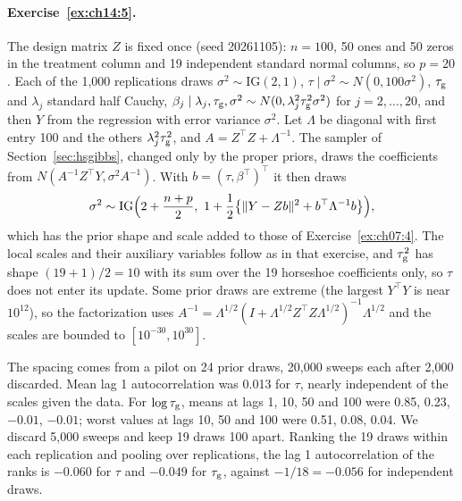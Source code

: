 \paragraph{Exercise~\ref{ex:ch14:5}.} The design matrix $Z$ is fixed once (seed 20261105): $n = 100$, 50 ones and 50 zeros in the treatment column and 19 independent standard normal columns, so $p = 20$. Each of the 1,000 replications draws $\sigma^2 \sim \mathrm{IG}(2, 1)$, $\tau \mid \sigma^2 \sim N(0, 100\sigma^2)$, $\tau_{\mathrm{g}}$ and $\lambda_j$ standard half Cauchy, $\beta_j \mid \lambda_j, \tau_{\mathrm{g}}, \sigma^2 \sim N(0, \lambda_j^2\tau_{\mathrm{g}}^2\sigma^2)$ for $j = 2, \dots, 20$, and then $Y$ from the regression with error variance $\sigma^2$. Let $\Lambda$ be diagonal with first entry 100 and the others $\lambda_j^2\tau_{\mathrm{g}}^2$, and $A = Z^\top Z + \Lambda^{-1}$. The sampler of Section~\ref{sec:hsgibbs}, changed only by the proper priors, draws the coefficients from $N(A^{-1}Z^\top Y, \sigma^2A^{-1})$. With $b = (\tau, \beta^\top)^\top$ it then draws
\[
\sigma^2 \sim \mathrm{IG}\Bigl(2 + \frac{n + p}{2},\ 1 + \frac12\bigl\{\|Y - Zb\|^2 + b^\top\Lambda^{-1}b\bigr\}\Bigr),
\]
which has the prior shape and scale added to those of Exercise~\ref{ex:ch07:4}. The local scales and their auxiliary variables follow as in that exercise, and $\tau_{\mathrm{g}}^2$ has shape $(19 + 1)/2 = 10$ with its sum over the 19 horseshoe coefficients only, so $\tau$ does not enter its update. Some prior draws are extreme (the largest $Y^\top Y$ is near $10^{12}$), so the factorization uses $A^{-1} = \Lambda^{1/2}(I + \Lambda^{1/2}Z^\top Z\Lambda^{1/2})^{-1}\Lambda^{1/2}$ and the scales are bounded to $[10^{-30}, 10^{30}]$.

The spacing comes from a pilot on 24 prior draws, 20,000 sweeps each after 2,000 discarded. Mean lag 1 autocorrelation was 0.013 for $\tau$, nearly independent of the scales given the data. For $\log\tau_{\mathrm{g}}$, means at lags 1, 10, 50 and 100 were 0.85, 0.23, $-0.01$, $-0.01$; worst values at lags 10, 50 and 100 were 0.51, 0.08, 0.04. We discard 5,000 sweeps and keep 19 draws 100 apart. Ranking the 19 draws within each replication and pooling over replications, the lag 1 autocorrelation of the ranks is $-0.060$ for $\tau$ and $-0.049$ for $\tau_{\mathrm{g}}$, against $-1/18=-0.056$ for independent draws.

